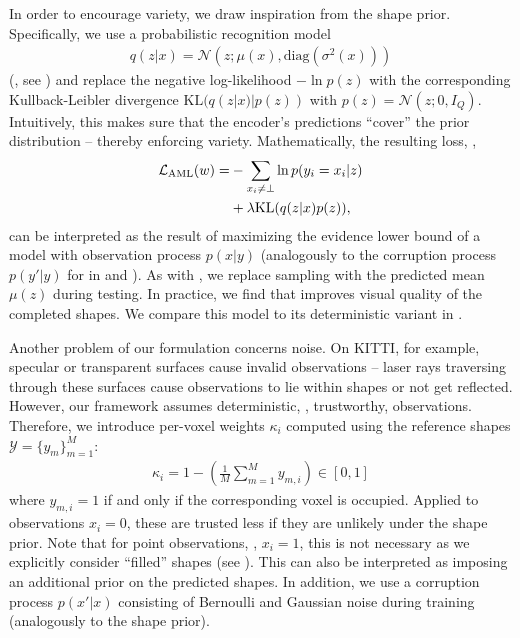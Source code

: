 In order to encourage variety, we draw inspiration from the \VAE shape prior. Specifically, we use a probabilistic recognition model
%
\begin{align}
q(z|x) = \mathcal{N}(z; \mu(x), \text{diag}(\sigma^2(x)))
\end{align}
%
(\eg, see ) and replace the negative log-likelihood $-\ln p(z)$ with the corresponding Kullback-Leibler divergence $\text{KL}(q(z|x)|p(z))$ with $p(z) = \mathcal{N}(z; 0, I_Q)$. Intuitively, this makes sure that the encoder's predictions ``cover'' the prior distribution -- thereby enforcing variety. Mathematically, the resulting loss, \ie, 
%
\begin{align}
\begin{split}
    \mathcal{L}_{\text{AML}}(w) =& - \sum _{x_i \neq \bot} \ln p(y_i = x_i | z)\\
    &+ \lambda \text{KL}(q(z|x)p(z)),\label{eq:daml}
\end{split}
\end{align}
%
can be interpreted as the result of maximizing the evidence lower bound of a model with observation process $p(x | y)$ (analogously to the corruption process $p(y'|y)$ for \DVAEs in \citep{Im2017AAAI} and ). As with \DVAEs, we replace sampling with the predicted mean $\mu(z)$ during testing. In practice, we find that  improves visual quality of the completed shapes. We compare this \AML model to its deterministic variant \dAML in .

%
Another problem of our \AML formulation concerns noise. On KITTI, for example, specular or transparent surfaces cause invalid observations -- laser rays traversing through these surfaces cause observations to lie within shapes or not get reflected. However, our \AML framework assumes deterministic, \ie, trustworthy, observations. Therefore, we introduce per-voxel weights $\kappa_i$ computed using the reference shapes $\mathcal{Y} = \{y_m\}_{m=1}^M$:
%
\begin{align}
\kappa_i = 1 - \left(\frac{1}{M} \sum_{m = 1}^M y_{m,i}\right) \in [0,1]
\end{align}
%
where $y_{m,i} = 1$ if and only if the corresponding voxel is occupied. Applied to observations $x_i = 0$, these are trusted less if they are unlikely under the shape prior. Note that for point observations, \ie, $x_i = 1$, this is not necessary as we explicitly consider ``filled'' shapes (see ). This can also be interpreted as imposing an additional prior on the predicted shapes. In addition, we use a corruption process $p(x' | x)$ consisting of Bernoulli and Gaussian noise during training (analogously to the \DVAE shape prior).

